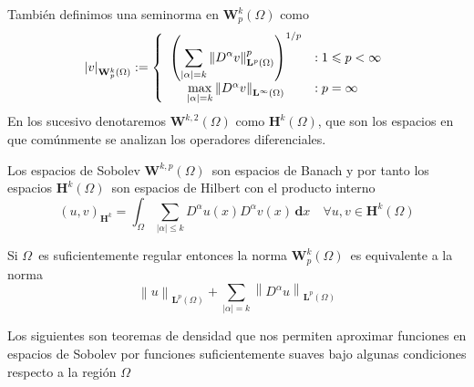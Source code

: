 También definimos una seminorma en $\mathbf{W}_{p}^{k}(\Omega )$ como
\[
\left| v\right| _{\mathbf{W}_{p}^{k}(\Omega )}:=\left\{
\begin{array}[c]{cl}
	\left( \displaystyle \sum_{\left| \alpha \right| =k}\left\| D^{\alpha }v\right\| _{%
		\mathbf{L}^{p}(\Omega )}^{p}\right) ^{1/p} & :1\leqslant p<\infty
	\\
	\max\limits_{\left| \alpha \right| =k}\left\| D^{\alpha }v\right\| _{\mathbf{%
			L}^{\infty }(\Omega )} & :p=\infty
\end{array}
\right.
\]
En los sucesivo denotaremos $\mathbf{W}^{k,2}(\Omega )$ como $\mathbf{H}%
^{k}(\Omega )$, que son los espacios en que comúnmente se analizan los
operadores diferenciales.

\begin{teo}
	Los espacios de Sobolev $\mathbf{W}^{k,p}(\Omega )$\ son espacios de Banach
	y por tanto los espacios $\mathbf{H}^{k}(\Omega )$\ son espacios de Hilbert
	con el producto interno
	\[
	\left( u,v\right) _{\mathbf{H}^{k}}=\int_{\Omega
	}\sum_{\left| \alpha \right| \mathbf{\leqslant }k}D^{\alpha }u\left(
	x\right) D^{\alpha }v\left( x\right) \,\mathbf{d}x\quad \forall u,v\in
	\mathbf{H}^{k}(\Omega )
	\]
\end{teo}

\begin{obs}
	Si $\Omega $\ es suficientemente regular entonces la norma $\mathbf{W}%
	_{p}^{k}(\Omega )$\ es equivalente a la norma
	\[
	\left\| u\right\| _{\mathbf{L}^{p}(\Omega )}+\sum_{\left| \alpha
		\right| =k}\left\| D^{\alpha }u\right\| _{\mathbf{L}^{p}(\Omega )}
	\]
\end{obs}
Los siguientes son teoremas de densidad que nos permiten aproximar
funciones en espacios de Sobolev por funciones suficientemente
suaves bajo algunas condiciones respecto a la región $\Omega $

